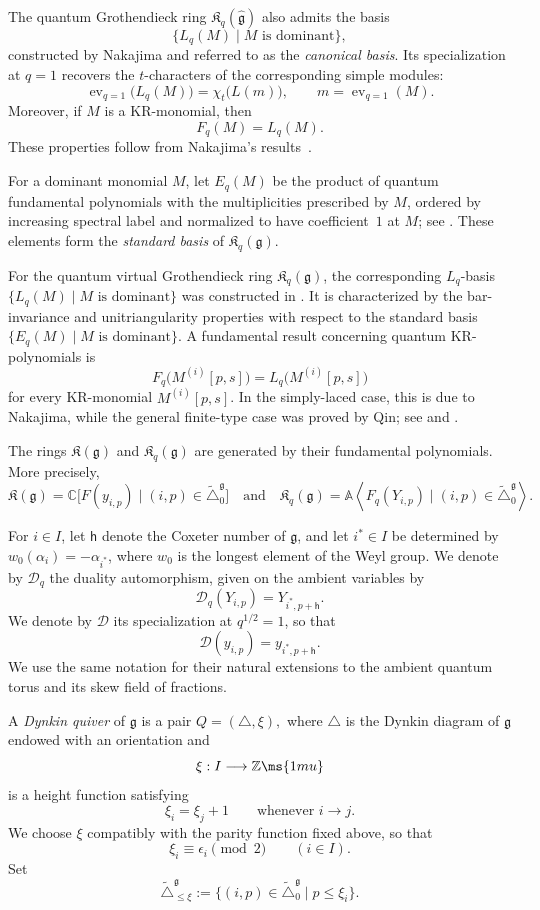 \documentclass[12pt, leqno]{amsart}
\numberwithin{equation}{section}
\theoremstyle{plain}
\theoremstyle{definition}
\renewcommand{\le}{\leqslant}
\newcommand{\seteq}{\mathbin{:=}}
\newcommand{\ev}{{\operatorname{ev}}}
\newcommand{\g}{\mathfrak{g}}
\newcommand{\C}{\mathbb{C}}
\newcommand{\Z}{\mathbb{Z}\ms{1mu}}
\newcommand{\Dynkin}{\triangle}
\newcommand{\hg}{{\widehat{\g}}}
\newcommand{\frakK}{\mathfrak{K}}
\newcommand{\sfh}{\mathsf{h}}
\newcommand{\bbA}{\mathbb{A}}
\newcommand{\calD}{\mathcal{D}}
\newcommand{\tDynkin}{{\widetilde{\Dynkin}}}
\newcommand{\qtq}[1][{and}]{\quad\text{{#1}}\quad}
\begin{document}
The quantum Grothendieck ring $\frakK_q(\hg)$ also admits the
basis
\[
  \{L_q(M)\mid M\text{ is dominant}\},
\]
constructed by Nakajima and referred to as the \emph{canonical basis}.  Its specialization at $q=1$ recovers the
$t$-characters of the corresponding simple modules:
\[
\ev_{q=1}\bigl(L_q(M)\bigr) = \chi_t\bigl(L(m)\bigr), \qquad m=\ev_{q=1}(M).
\]
Moreover, if $M$ is a KR-monomial, then
\[
F_q(M)=L_q(M).
\]
These properties follow from Nakajima's results~\cite{Nak01}.

For a dominant monomial $M$, let $E_q(M)$ be the product of quantum
fundamental polynomials with the multiplicities prescribed by $M$,
ordered by increasing spectral label and normalized to have
coefficient~$1$ at $M$; see \cite[(5.21)]{JLO1}.
These elements form the \emph{standard basis} of $\frakK_q(\g)$.

For the quantum virtual Grothendieck ring $\frakK_q(\g)$, the
corresponding $L_q$-basis
$\{L_q(M)\mid M\text{ is dominant}\}$
was constructed in \cite{JLO1}.  It is characterized by the
bar-invariance and unitriangularity properties with respect to the
 standard basis $\{E_q(M)\mid M\text{ is dominant}\}$.  A fundamental result concerning quantum KR-polynomials is
\[
F_q\bigl(M^{(i)}[p,s]\bigr)
=
L_q\bigl(M^{(i)}[p,s]\bigr)
\]
for every KR-monomial $M^{(i)}[p,s]$.  In the simply-laced case,
this is due to Nakajima, while the general finite-type case was
proved by Qin; see \cite{Nak03} and \cite[Theorem~1.1]{Qin24B}.

The rings $\frakK(\g)$ and $\frakK_q(\g)$ are generated by their
fundamental polynomials.  More precisely,
\[
\frakK(\g) = \C\bigl[F(y_{i,p})\mid(i,p)\in\tDynkin_0^\g\bigr]
\qtq
\frakK_q(\g) = \bbA\left\langle F_q(Y_{i,p})\mid(i,p)\in\tDynkin_0^\g\right\rangle.
\]







For $i\in I$, let $\sfh$ denote the Coxeter number of $\g$, and let $i^*\in I$ be determined by
$w_0(\alpha_i)=-\alpha_{i^*}$, where $w_0$ is the longest element of
the Weyl group.
We denote by $\calD_q$ the duality automorphism, given on the ambient
variables by
\[
\calD_q(Y_{i,p})=Y_{i^*,p+\sfh}.
\]
We denote by $\calD$ its specialization at $q^{1/2}=1$, so that
\[
\calD(y_{i,p})=y_{i^*,p+\sfh}.
\]
We use the same notation for their natural extensions to the ambient
quantum torus and its skew field of fractions.


A \emph{Dynkin quiver} of $\g$ is a pair
$Q=(\Dynkin,\xi),$
where $\Dynkin$ is the Dynkin diagram of $\g$ endowed with an
orientation and
\[
\xi:I\longrightarrow\Z
\]
is a height function satisfying
\[
\xi_i=\xi_j+1 \qquad \text{whenever } i\to j.
\]
We choose $\xi$ compatibly with the parity function fixed above, so
that
\[
\xi_i\equiv\epsilon_i\pmod2 \qquad(i\in I).
\]
Set
\[
\tDynkin_{\le\xi}^\g \seteq \{(i,p)\in\tDynkin_0^\g\mid p\le\xi_i\}.
\]
\end{document}
